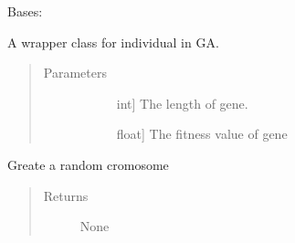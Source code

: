 \documentclass[letterpaper,10pt,english]{sphinxmanual}
\begin{document}
\begin{fulllineitems}
\label{\detokenize{pygace:pygace.ga.Cromosome}}
\sphinxAtStartPar
Bases: 

\sphinxAtStartPar
A wrapper class for individual in GA.
\begin{quote}\begin{description}
\item[{Parameters}] \leavevmode\begin{description}
\item[{}] \leavevmode{[}int{]}
\sphinxAtStartPar
The length of gene.

\item[{}] \leavevmode{[}float{]}
\sphinxAtStartPar
The fitness value of gene

\end{description}

\end{description}\end{quote}

\begin{fulllineitems}
\label{\detokenize{pygace:pygace.ga.Cromosome.generate_cromosome}}
\sphinxAtStartPar
Greate a random cromosome
\begin{quote}\begin{description}
\item[{Returns}] \leavevmode\begin{description}
\item[{None}] \leavevmode
\end{description}

\end{description}\end{quote}

\end{fulllineitems}



\end{fulllineitems}
\end{document}
